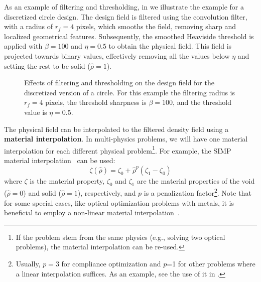     As an example of filtering and thresholding, in 
     we illustrate the example for a discretized circle design.
    The design field is filtered using the convolution filter, with a radius of $r_f=4$ pixels, which smooths the field, removing sharp and localized
    geometrical features. Subsequently, the smoothed Heaviside threshold is applied with $\beta=100$ and $\eta=0.5$ to obtain the physical field. This field is projected towards binary 
    values, effectively removing all the values below $\eta$ and setting the rest to be solid ($\hat{\rho}=1$).

    \begin{figure}[tb]
        \centering

        \caption{Effects of filtering and thresholding on the design field for the discretized
        version of a circle. For this example the filtering radius is $r_f=4$ pixels, the threshold sharpness is 
        $\beta=100$, and the threshold value is $\eta=0.5$.}
        \label{fig:ft}
    \end{figure}

    The physical field can be interpolated to the filtered density field using a
    \textbf{material interpolation}.
    In multi-physics problems, we will have one material interpolation for each
    different physical problem\footnote{If the problem stem from the same physics
        (e.g., solving two optical problems), the material interpolation can be
        re-used.}.
    For example, the SIMP material interpolation~\cite{SIMP} can be used:
    \begin{equation}
        \zeta(\hat{\rho})=\zeta_0+\hat{\rho}^p\left(\zeta_1-\zeta_0\right)
    \end{equation}
    where $\zeta$ is the material property, $\zeta_0$ and $\zeta_1$ are the
    material properties of the void ($\hat{\rho}=0$) and solid ($\hat{\rho}=1$), respectively, and $p$
    is a penalization factor\footnote{Usually, $p=3$ for compliance optimization and $p$=1
    for other problems where a linear interpolation suffices. As an example, see the use of it in \cite{ownpub3,ownpub4}.}. Note that for some
    special cases, like optical optimization problems with metals, it is beneficial
    to employ a non-linear material interpolation~\cite{nonlinear_interp,ownpub0}.

